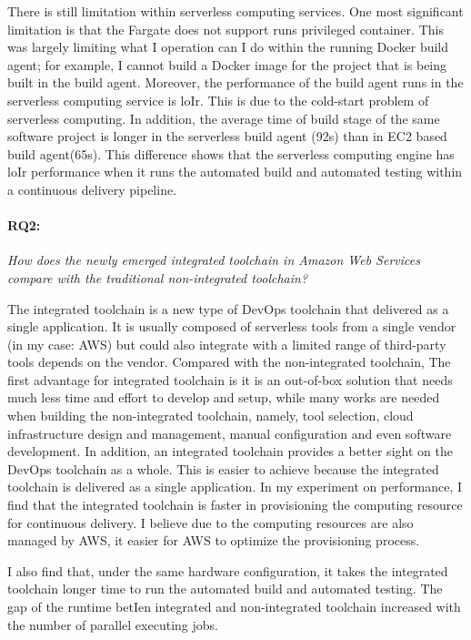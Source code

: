 There is still limitation within serverless computing services. One most significant limitation is that the Fargate does not support runs privileged container. This was largely limiting what I operation can I do within the running Docker build agent; for example, I cannot build a Docker image for the project that is being built in the build agent. Moreover, the performance of the build agent runs in the serverless computing service is loIr. This is due to the cold-start problem of serverless computing. In addition, the average time of build stage of the same software project is longer in the serverless build agent (92s) than in EC2 based build agent(65s). This difference shows that the serverless computing engine has loIr performance when it runs the automated build and automated testing within a continuous delivery pipeline.
\paragraph{RQ2:} \textit{How does the newly emerged integrated toolchain in Amazon Web Services compare with the traditional non-integrated toolchain?}
\medskip
\par
The integrated toolchain is a new type of DevOps toolchain that delivered as a single application. It is usually composed of serverless tools from a single vendor (in my case: AWS) but could also integrate with a limited range of third-party tools depends on the vendor. Compared with the non-integrated toolchain, The first advantage for integrated toolchain is it is an out-of-box solution that needs much less time and effort to develop and setup, while many works are needed when building the non-integrated toolchain, namely, tool selection, cloud infrastructure design and management, manual configuration and even software development. In addition, an integrated toolchain provides a better sight on the DevOps toolchain as a whole. This is easier to achieve because the integrated toolchain is delivered as a single application. In my experiment on performance, I find that the integrated toolchain is faster in provisioning the computing resource for continuous delivery. I believe due to the computing resources are also managed by AWS, it easier for AWS to optimize the provisioning process.
\par
I also find that, under the same hardware configuration, it takes the integrated toolchain longer time to run the automated build and automated testing. The gap of the runtime betIen integrated and non-integrated toolchain increased with the number of parallel executing jobs.
